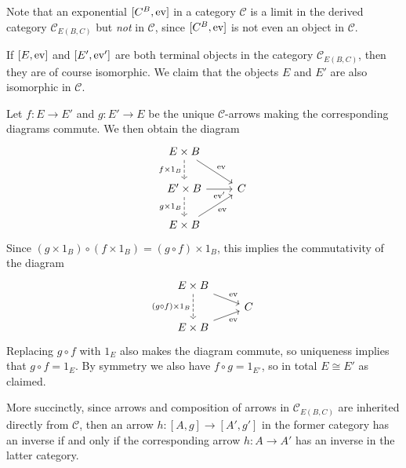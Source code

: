 \documentclass[article, a4paper, 11pt, oneside]{memoir}
\numberwithin{equation}{chapter}
\newcommand{\cat}[1]{\mathcal{#1}}
\newcommand{\catC}{\cat{C}}
\theoremstyle{myexample}
\theoremstyle{myexamplebreak}
\begin{document}
Note that an exponential $[C^B, \mathrm{ev}]$ in a category $\catC$ is a limit in the derived category $\catC_{E(B,C)}$ but \emph{not} in $\catC$, since $[C^B, \mathrm{ev}]$ is not even an object in $\catC$.


\begin{remark}
    If $[E, \mathrm{ev}]$ and $[E', \mathrm{ev}']$ are both terminal objects in the category $\catC_{E(B,C)}$, then they are of course isomorphic. We claim that the objects $E$ and $E'$ are also isomorphic in $\catC$.

    Let $f \colon E \to E'$ and $g \colon E' \to E$ be the unique $\catC$-arrows making the corresponding diagrams commute. We then obtain the diagram
    \begin{equation*}
        \begin{tikzcd}
            E \times B
                \ar[d, "f \times 1_B", swap, dashed]
                \ar[dr, "\eval"]
            \\
            E' \times B
                \ar[r, "\eval'", swap]
                \ar[d, "g \times 1_B", swap, dashed]
            & C
            \\
            E \times B
                \ar[ur, "\eval", swap]
        \end{tikzcd}
    \end{equation*}
    Since $(g \times 1_B) \circ (f \times 1_B) = (g \circ f) \times 1_B$, this implies the commutativity of the diagram
    \begin{equation*}
        \begin{tikzcd}[row sep=tiny]
            E \times B
                \ar[dd, "(g \circ f) \times 1_B", swap, dashed]
                \ar[dr, "\eval"]
            \\
            & C
            \\
            E \times B
                \ar[ur, "\eval", swap]
        \end{tikzcd}
    \end{equation*}
    Replacing $g \circ f$ with $1_E$ also makes the diagram commute, so uniqueness implies that $g \circ f = 1_E$. By symmetry we also have $f \circ g = 1_{E'}$, so in total $E \cong E'$ as claimed.

    More succinctly, since arrows and composition of arrows in $\catC_{E(B,C)}$ are inherited directly from $\catC$, then an arrow $h \colon [A,g] \to [A',g']$ in the former category has an inverse if and only if the corresponding arrow $h \colon A \to A'$ has an inverse in the latter category.
\end{remark}
\end{document}
